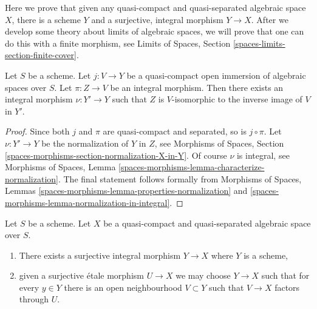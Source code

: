 \noindent
Here we prove that given any quasi-compact and quasi-separated
algebraic space $X$, there is a scheme $Y$ and a surjective, integral
morphism $Y \to X$. After we develop some theory about limits of
algebraic spaces, we will prove that one can do this with a finite
morphism, see
Limits of Spaces, Section \ref{spaces-limits-section-finite-cover}.

\begin{lemma}
\label{lemma-extend-integral-morphism}
Let $S$ be a scheme. Let $j : V \to Y$ be a quasi-compact open immersion
of algebraic spaces over $S$. Let $\pi : Z \to V$ be an integral morphism.
Then there exists an integral morphism $\nu : Y' \to Y$ such that
$Z$ is $V$-isomorphic to the inverse image of $V$ in $Y'$.
\end{lemma}

\begin{proof}
Since both $j$ and $\pi$ are quasi-compact and separated, so is
$j \circ \pi$. Let $\nu : Y' \to Y$ be the normalization of $Y$ in $Z$, see
Morphisms of Spaces, Section
\ref{spaces-morphisms-section-normalization-X-in-Y}.
Of course $\nu$ is integral, see
Morphisms of Spaces, Lemma
\ref{spaces-morphisms-lemma-characterize-normalization}.
The final statement follows formally from
Morphisms of Spaces, Lemmas
\ref{spaces-morphisms-lemma-properties-normalization} and
\ref{spaces-morphisms-lemma-normalization-in-integral}.
\end{proof}

\begin{lemma}
\label{lemma-there-is-a-scheme-integral-over}
Let $S$ be a scheme. Let $X$ be a quasi-compact and quasi-separated
algebraic space over $S$.
\begin{enumerate}
\item There exists a surjective integral morphism $Y \to X$ where $Y$
is a scheme,
\item given a surjective \'etale morphism $U \to X$ we may choose
$Y \to X$ such that for every $y \in Y$ there is an open neighbourhood
$V \subset Y$ such that $V \to X$ factors through $U$.
\end{enumerate}
\end{lemma}

